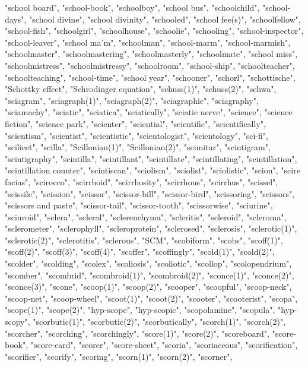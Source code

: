 "school board",
"school-book",
"schoolboy",
"school bus",
"schoolchild",
"school-days",
"school divine",
"school divinity",
"schooled",
"school fee(s)",
"schoolfellow",
"school-fish",
"schoolgirl",
"schoolhouse",
"schoolie",
"schooling",
"school-inspector",
"school-leaver",
"school ma'm",
"schoolman",
"school-marm",
"school-marmish",
"schoolmaster",
"schoolmastering",
"schoolmasterly",
"schoolmate",
"school miss",
"schoolmistress",
"schoolmistressy",
"schoolroom",
"school-ship",
"schoolteacher",
"schoolteaching",
"school-time",
"school year",
"schooner",
"schorl",
"schottische",
"Schottky effect",
"Schrodinger equation",
"schuss(1)",
"schuss(2)",
"schwa",
"sciagram",
"sciagraph(1)",
"sciagraph(2)",
"sciagraphic",
"sciagraphy",
"sciamachy",
"sciatic",
"sciatica",
"sciatically",
"sciatic nerve",
"science",
"science fiction",
"science park",
"scienter",
"sciential",
"scientific",
"scientifically",
"scientism",
"scientist",
"scientistic",
"scientologist",
"scientology",
"sci-fi",
"scilicet",
"scilla",
"Scillonian(1)",
"Scillonian(2)",
"scimitar",
"scintigram",
"scintigraphy",
"scintilla",
"scintillant",
"scintillate",
"scintillating",
"scintillation",
"scintillation counter",
"scintiscan",
"sciolism",
"sciolist",
"sciolistic",
"scion",
"scire facias",
"scirocco",
"scirrhoid",
"scirrhosity",
"scirrhous",
"scirrhus",
"scissel",
"scissile",
"scission",
"scissor",
"scissor-bill",
"scissor-bird",
"scissoring",
"scissors",
"scissors and paste",
"scissor-tail",
"scissor-tooth",
"scissorwise",
"sciurine",
"sciuroid",
"sclera",
"scleral",
"sclerenchyma",
"scleritis",
"scleroid",
"scleroma",
"sclerometer",
"sclerophyll",
"scleroprotein",
"sclerosed",
"sclerosis",
"sclerotic(1)",
"sclerotic(2)",
"sclerotitis",
"sclerous",
"SCM",
"scobiform",
"scobs",
"scoff(1)",
"scoff(2)",
"scoff(3)",
"scoff(4)",
"scoffer",
"scoffingly",
"scold(1)",
"scold(2)",
"scolder",
"scolding",
"scolex",
"scoliosis",
"scoliotic",
"scollop",
"scolopendrium",
"scomber",
"scombrid",
"scombroid(1)",
"scombroid(2)",
"sconce(1)",
"sconce(2)",
"sconce(3)",
"scone",
"scoop(1)",
"scoop(2)",
"scooper",
"scoopful",
"scoop-neck",
"scoop-net",
"scoop-wheel",
"scoot(1)",
"scoot(2)",
"scooter",
"scooterist",
"scopa",
"scope(1)",
"scope(2)",
"hyp-scope",
"hyp-scopic",
"scopolamine",
"scopula",
"hyp-scopy",
"scorbutic(1)",
"scorbutic(2)",
"scorbutically",
"scorch(1)",
"scorch(2)",
"scorcher",
"scorching",
"scorchingly",
"score(1)",
"score(2)",
"scoreboard",
"score-book",
"score-card",
"scorer",
"score-sheet",
"scoria",
"scoriaceous",
"scorification",
"scorifier",
"scorify",
"scoring",
"scorn(1)",
"scorn(2)",
"scorner",
